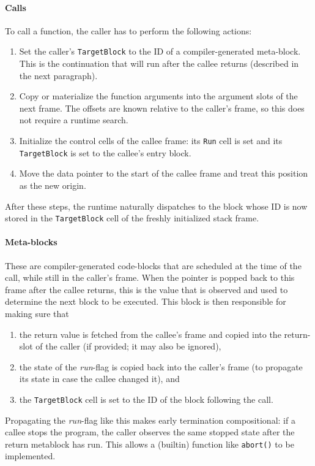 \paragraph{Calls} To call a function, the caller has to perform the following actions:
\begin{enumerate}
\item Set the caller's \texttt{TargetBlock} to the ID of a compiler-generated meta-block. This is the continuation that will run after the callee returns (described in the next paragraph).
\item Copy or materialize the function arguments into the argument slots of the next frame. The offsets are known relative to the caller's frame, so this does not require a runtime search.
\item Initialize the control cells of the callee frame: its \texttt{Run} cell is set and its \texttt{TargetBlock} is set to the callee's entry block.
\item Move the data pointer to the start of the callee frame and treat this position as the new origin.
\end{enumerate}
After these steps, the runtime naturally dispatches to the block whose ID is now stored in the \texttt{TargetBlock} cell of the freshly initialized stack frame.

\paragraph{Meta-blocks} These are compiler-generated code-blocks that are scheduled at the time of the call, while still in the caller's frame. When the pointer is popped back to this frame after the callee returns, this is the value that is observed and used to determine the next block to be executed. This block is then responsible for making sure that
\begin{enumerate}
\item the return value is fetched from the callee's frame and copied into the return-slot of the caller (if provided; it may also be ignored),
\item the state of the \emph{run}-flag is copied back into the caller's frame (to propagate its state in case the callee changed it), and 
\item the \texttt{TargetBlock} cell is set to the ID of the block following the call.
\end{enumerate}

Propagating the \emph{run}-flag like this makes early termination compositional: if a callee stops the program, the caller observes the same stopped state after the return metablock has run. This allows a (builtin) function like \texttt{abort()} to be implemented.

